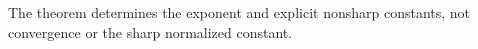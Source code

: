 The theorem determines the exponent and explicit nonsharp constants, not convergence or the sharp normalized constant.